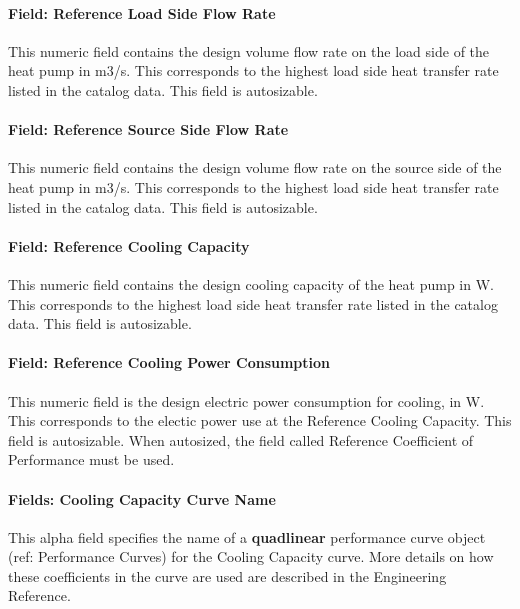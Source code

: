 \paragraph{Field: Reference Load Side Flow Rate}\label{field-rated-load-side-flow-rate}

This numeric field contains the design volume flow rate on the load side of the heat pump in m3/s. This corresponds to the highest load side heat transfer rate listed in the catalog data. This field is autosizable.

\paragraph{Field: Reference Source Side Flow Rate}\label{field-rated-source-side-flow-rate}

This numeric field contains the design volume flow rate on the source side of the heat pump in m3/s. This corresponds to the highest load side heat transfer rate listed in the catalog data. This field is autosizable.

\paragraph{Field: Reference Cooling Capacity}\label{field-rated-cooling-capacity}

This numeric field contains the design cooling capacity of the heat pump in W. This corresponds to the highest load side heat transfer rate listed in the catalog data. This field is autosizable.

\paragraph{Field: Reference Cooling Power Consumption}\label{field-rated-cooling-power-consumption}

This numeric field is the design electric power consumption for cooling, in W.  This corresponds to the electic power use at the Reference Cooling Capacity. This field is autosizable.  When autosized, the field called Reference Coefficient of Performance must be used.

\paragraph{Fields: Cooling Capacity Curve Name}\label{fields-cooling-capacity-curve-name}

This alpha field specifies the name of a \textbf{quadlinear} performance curve object (ref: Performance Curves) for the Cooling Capacity curve. More details on how these coefficients in the curve are used are described in the Engineering Reference.

